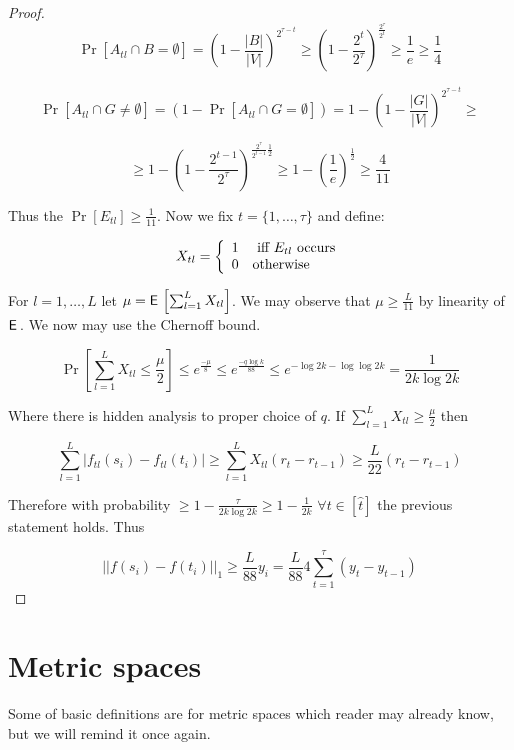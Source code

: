 \begin{proof}
	$$
	\Pr[A_{tl} \cap B = \emptyset] = \left( 1 - \frac{|B|}{|V|} \right) ^{2^{\tau - t}} \geq \left( 1 - \frac{2^{t}}{2^{\tau}} \right) ^{\frac{2^{\tau}}{2^{t}}} \geq \frac{1}{e} \geq \frac{1}{4}
	$$
	
	$$
	\Pr[A_{tl} \cap G \neq \emptyset] = (1 - \Pr[A_{tl} \cap G = \emptyset]) = 1 - \left( 1 - \frac{|G|}{|V|} \right)^{2^{\tau - t}} \geq
	$$
	
	$$
	\geq 1 - \left( 1 - \frac{2^{t -1}}{2^{\tau}} \right)^{\frac{2^{\tau}}{2^{t-1}} \frac{1}{2}} \geq 1 - \left( \frac{1}{e} \right)^{\frac{1}{2}} \geq \frac{4}{11}
	$$
	
	Thus the $\Pr[E_{tl}] \geq \frac{1}{11}$. Now we fix $t = \{1, \dots, \tau\}$ and define:
	
	$$
	X_{tl} = \left\{
	\begin{array}{l l}
		1 & \text{ iff } E_{tl} \text{ occurs} \\
		0 & \text{otherwise}
	\end{array}
	\right.
	$$
	
	For $l = 1, \dots, L$ let $\mu = \operatorname{\textsf{E}\,} \left[ \sum_{l = 1}^{L} X_{tl} \right]$. We may observe that $\mu \geq \frac{L}{11}$ by linearity of $\operatorname{\textsf{E}\,}$. We now may use the Chernoff bound.
	
	$$
	\Pr \left[ \sum_{l = 1}^{L} X_{tl} \leq \frac{\mu}{2} \right] \leq e^{\frac{-\mu}{8}} \leq e^{\frac{-q \log k}{88}} \leq e^{-\log 2k - \log\log2k} = \frac{1}{2k \log 2k}
	$$
	
	Where there is hidden analysis to proper choice of $q$. If $\sum_{l = 1}^{L} X_{tl} \geq \frac{\mu}{2}$ then
	
	$$
	\sum_{l = 1}^{L} |f_{tl}(s_{i}) - f_{tl}(t_{i})| \geq \sum_{l = 1}^{L} X_{tl} (r_{t} - r_{t-1}) \geq \frac{L}{22} (r_{t} - r_{t-1})
	$$
	
	Therefore with probability $\geq 1 - \frac{\tau}{2k \log 2k} \geq 1 - \frac{1}{2k}$ $\forall t \in [\hat{t}]$ the previous statement holds. Thus
	
	$$
	||f(s_{i}) - f(t_{i})||_{1} \geq \frac{L}{88} y_{i} = \frac{L}{88} 4 \sum_{t = 1}^{\tau} (y_{t} - y_{t-1})
	$$
\end{proof}

\section{Metric spaces}

Some of basic definitions are for metric spaces which reader may already know, but we will remind it once again.

